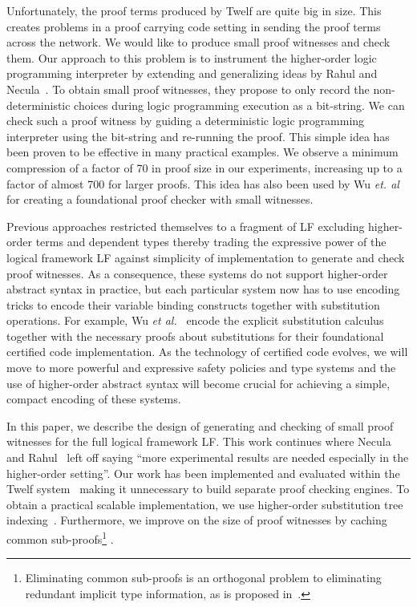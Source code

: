 \documentclass{llncs}
\begin{document}
Unfortunately, the proof terms produced by Twelf are quite big in
size.  This creates problems in a proof carrying code setting in
sending the proof terms across the network. We would like to produce
small proof witnesses and check them. Our approach to this problem is
to instrument the higher-order logic programming interpreter by
extending and generalizing ideas by Rahul and
Necula~\cite{Necula+01:oracle}. To obtain small proof witnesses, they
propose to only record the non-deterministic choices during logic
programming execution as a bit-string. We can check such a proof
witness by guiding a deterministic logic programming interpreter using
the bit-string and re-running the proof. This simple idea has been
proven to be effective in many practical examples. We observe a
minimum compression of a factor of 70 in proof size in our
experiments, increasing up to a factor of almost 700 for larger
proofs. This idea has also been used by Wu
{\em{et. al}}~\cite{Appel:PPDP03} for creating a foundational proof
checker with small witnesses.

Previous approaches restricted themselves to a fragment of LF
excluding higher-order terms and dependent types thereby trading the
expressive power of the logical framework LF against simplicity of
implementation to generate and check proof witnesses.  As a
consequence, these systems do not support higher-order abstract syntax
in practice, but each particular system now has to use encoding tricks
to encode their variable binding constructs together with substitution
operations. For example, Wu {\em et al.}~\cite{Appel:PPDP03} encode the
explicit substitution calculus~\cite{Abadi:POPL90} together with the
necessary proofs about substitutions for their foundational certified
code implementation. As the technology of certified code evolves, we
will move to more powerful and expressive safety policies and type
systems and the use of higher-order abstract syntax will become
crucial for achieving a simple, compact encoding of these systems.

In this paper, we describe the design of generating and checking of
small proof witnesses for the full logical framework LF. This work
continues where Necula and Rahul~\cite{Necula+01:oracle} left off
saying ``more experimental results are needed especially in the
higher-order setting''. Our work has been implemented and evaluated
within the Twelf system~\cite{Pfenning99cade} making it unnecessary to
build separate proof checking engines. To obtain a practical scalable
implementation, we use higher-order substitution tree
indexing~\cite{Pientka:ICLP03}. Furthermore, we improve on the size of
proof witnesses by caching common sub-proofs\footnote{Eliminating
common sub-proofs is an orthogonal problem to eliminating redundant
implicit type information, as is proposed in~\cite{Necula98lics}.}  .
\end{document}
